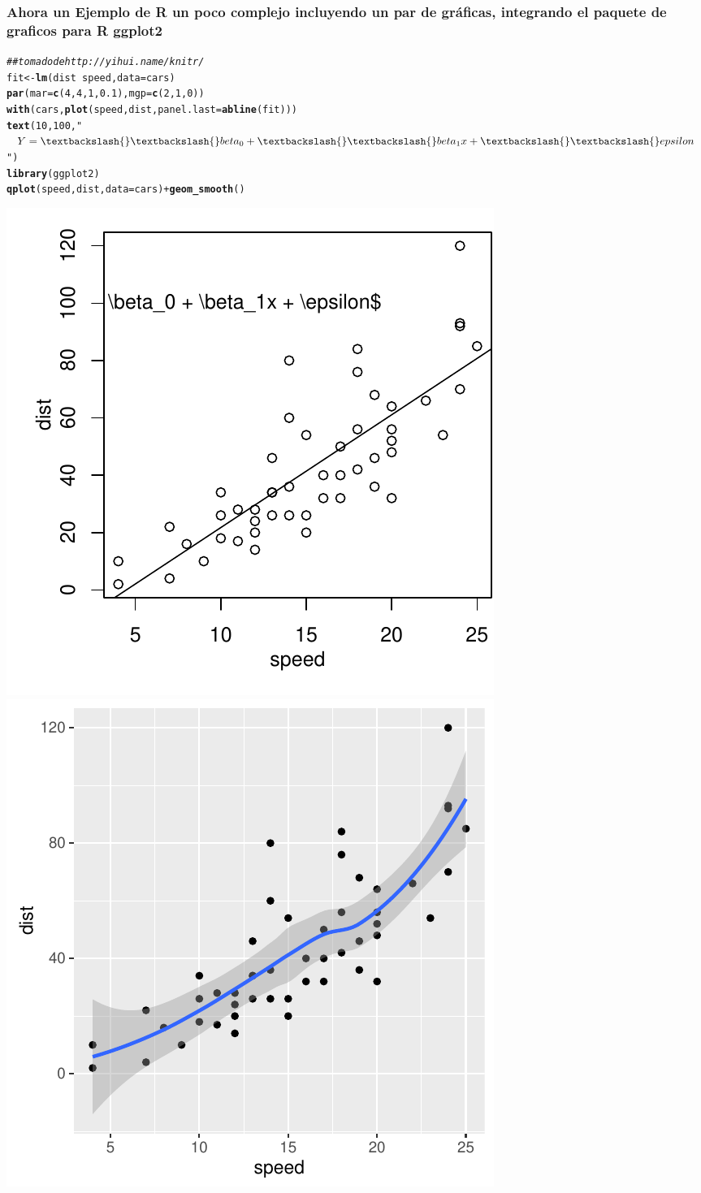 \documentclass{article}\usepackage[]{graphicx}\usepackage[]{color}
\makeatletter
\newcommand{\hlnum}[1]{\textcolor[rgb]{0.686,0.059,0.569}{#1}}%
\newcommand{\hlstr}[1]{\textcolor[rgb]{0.192,0.494,0.8}{#1}}%
\newcommand{\hlcom}[1]{\textcolor[rgb]{0.678,0.584,0.686}{\textit{#1}}}%
\newcommand{\hlopt}[1]{\textcolor[rgb]{0,0,0}{#1}}%
\newcommand{\hlstd}[1]{\textcolor[rgb]{0.345,0.345,0.345}{#1}}%
\newcommand{\hlkwb}[1]{\textcolor[rgb]{0.69,0.353,0.396}{#1}}%
\newcommand{\hlkwc}[1]{\textcolor[rgb]{0.333,0.667,0.333}{#1}}%
\newcommand{\hlkwd}[1]{\textcolor[rgb]{0.737,0.353,0.396}{\textbf{#1}}}%
\newenvironment{kframe}{%
 \def\at@end@of@kframe{}%
 \ifinner\ifhmode%
  \def\at@end@of@kframe{\end{minipage}}%
  \begin{minipage}{\columnwidth}%
 \fi\fi%
 \def\FrameCommand##1{\hskip\@totalleftmargin \hskip-\fboxsep
 \colorbox{shadecolor}{##1}\hskip-\fboxsep
     \hskip-\linewidth \hskip-\@totalleftmargin \hskip\columnwidth}%
 \MakeFramed {\advance\hsize-\width
   \@totalleftmargin\z@ \linewidth\hsize
   \@setminipage}}%
 {\par\unskip\endMakeFramed%
 \at@end@of@kframe}
\newenvironment{knitrout}{}{} %
\makeatother
\begin{document}
\subsubsection*{Ahora un Ejemplo de R un poco complejo incluyendo un par de gráficas, integrando el paquete de graficos para R ggplot2}
\begin{knitrout}
\color{fgcolor}\begin{kframe}
\begin{alltt}
\hlcom{## tomado de http://yihui.name/knitr/}
\hlstd{fit} \hlkwb{<-} \hlkwd{lm}\hlstd{(dist} \hlopt{~} \hlstd{speed,} \hlkwc{data} \hlstd{= cars)}
\hlkwd{par}\hlstd{(}\hlkwc{mar} \hlstd{=} \hlkwd{c}\hlstd{(}\hlnum{4}\hlstd{,} \hlnum{4}\hlstd{,} \hlnum{1}\hlstd{,} \hlnum{0.1}\hlstd{),} \hlkwc{mgp} \hlstd{=} \hlkwd{c}\hlstd{(}\hlnum{2}\hlstd{,} \hlnum{1}\hlstd{,} \hlnum{0}\hlstd{))}
\hlkwd{with}\hlstd{(cars,} \hlkwd{plot}\hlstd{(speed, dist,} \hlkwc{panel.last} \hlstd{=} \hlkwd{abline}\hlstd{(fit)))}
\hlkwd{text}\hlstd{(}\hlnum{10}\hlstd{,} \hlnum{100}\hlstd{,} \hlstr{"$Y = \textbackslash{}\textbackslash{}beta_0 + \textbackslash{}\textbackslash{}beta_1x + \textbackslash{}\textbackslash{}epsilon$"}\hlstd{)}
\hlkwd{library}\hlstd{(ggplot2)}
\hlkwd{qplot}\hlstd{(speed, dist,} \hlkwc{data} \hlstd{= cars)} \hlopt{+} \hlkwd{geom_smooth}\hlstd{()}
\end{alltt}
\end{kframe}

{\centering \includegraphics[width=.4\linewidth]{figure/minimal-r2-1} 
\includegraphics[width=.4\linewidth]{figure/minimal-r2-2} 

}



\end{knitrout}
\end{document}
